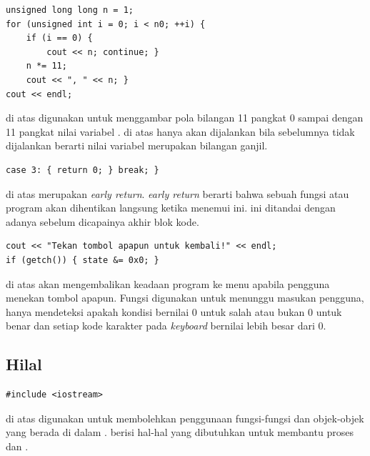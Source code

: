 \documentclass[../main.tex]{subfiles}
\begin{document}
\begin{code}
\begin{verbatim}
unsigned long long n = 1;
for (unsigned int i = 0; i < n0; ++i) {
	if (i == 0) {
		cout << n; continue; }
	n *= 11;
	cout << ", " << n; }
cout << endl;
\end{verbatim}
\end{code}

{\Script} di atas digunakan untuk menggambar pola bilangan 11 pangkat 0 sampai dengan 11 pangkat nilai variabel . {\Script} di atas hanya akan dijalankan bila {\script} sebelumnya tidak dijalankan berarti nilai variabel  merupakan bilangan ganjil.

\begin{code}
\begin{verbatim}
case 3: { return 0; } break; }
\end{verbatim}
\end{code}

{\Script} di atas merupakan {\statement} \textit{early return}. {\Statement} \textit{early return} berarti bahwa sebuah fungsi atau program akan dihentikan langsung ketika menemui {\statement} ini. {\Statement} ini ditandai dengan adanya {\statement}  sebelum dicapainya akhir blok kode.

\begin{code}
\begin{verbatim}
cout << "Tekan tombol apapun untuk kembali!" << endl;
if (getch()) { state &= 0x0; }
\end{verbatim}
\end{code}

{\Script} di atas akan mengembalikan keadaan program ke menu apabila pengguna menekan tombol apapun. Fungsi  digunakan untuk menunggu masukan pengguna, {\statement}  hanya mendeteksi apakah kondisi bernilai 0 untuk salah atau bukan 0 untuk benar dan setiap kode karakter pada \textit{keyboard} bernilai lebih besar dari 0.

\subsection{Hilal}
\begin{code}
\begin{verbatim}
#include <iostream>
\end{verbatim}
\end{code}

{\Script} di atas digunakan untuk membolehkan penggunaan fungsi-fungsi dan objek-objek yang berada di dalam {\header} {\file} . {\Header} {\file}  berisi hal-hal yang dibutuhkan untuk membantu proses {\ioi} dan {\ioo}.
\end{document}
